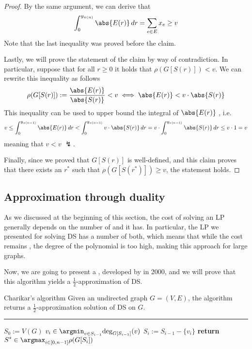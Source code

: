 \documentclass[a4paper, 12pt]{report}
\begin{document}
\begin{proof}
{            By the same argument, we can derive that $$\int_0^{y_{\pi(n)}}{\abs{E(r)} \, dr} = \sum_{e \in E}{x_e} \ge v$$ Note that the last inequality was proved before the claim.

            Lastly, we will prove the statement of the claim by way of contradiction. In particular, suppose that for all $r \ge 0$ it holds that $\rho(G[S(r)]) < v$. We can rewrite this inequality as follows $$\rho(G[S(r)]) := \dfrac{\abs{E(r)}}{\abs{S(r)}} < v \iff \abs{E(r)} < v \cdot \abs{S(r)}$$ This inequality can be used to upper bound the integral of $\abs{E(r)}$ , i.e. $$v \le \int_0^{y_{\pi(n - 1)}}{\abs{E(r)} \, dr} < \int_0^{y_{\pi(n - 1)}}{v \cdot \abs{S(r)} \, dr} = v \cdot \int_0^{y_{\pi(n - 1)}}{\abs{S(r)} \, dr} \le v \cdot 1 = v$$ meaning that $v < v$ $\lightning$.
        }

        Finally, since we proved that $G[S(r)]$ is well-defined, and this claim proves that there exists an $r^*$ such that $\rho(G[S(r^*)]) \ge v$, the statement holds.
    \end{proof}

    \subsection{Approximation through duality}

    As we discussed at the beginning of this section, the cost of solving an LP generally depends on the number of  and  it has. In particular, the LP we presented for solving DS has a  number of both, which means that while the cost remains , the degree of the polynomial is too high, making this approach  for large graphs.

    Now, we are going to present a , developed by \textcite{charikar} in 2000, and we will prove that this algorithm yields a $\tfrac{1}{2}$-approximation of DS.

    \begin{framedalgo}[label={charikar's algo}]{Charikar's algorithm}
        Given an undirected graph $G = (V, E)$, the algorithm returns a $\tfrac{1}{2}$-approximation solution of DS on $G$. \\
        \hrule

        \quad
        \begin{algorithmic}[1]
                \State $S_0 := V(G)$
                    \State $\displaystyle v_i \in \argmin_{v \in S_{i - 1}}{\deg_{G[S_{i - 1}]}(v)}$
                    \State $S_i := S_{i - 1} - \{v_i\}$
                \EndFor
                \State \textbf{return} $\displaystyle S^* \in \argmax_{i \in [0, n - 1]}{\rho(G[S_i])}$
            \EndFunction
        \end{algorithmic}
    \end{framedalgo}
\end{document}
